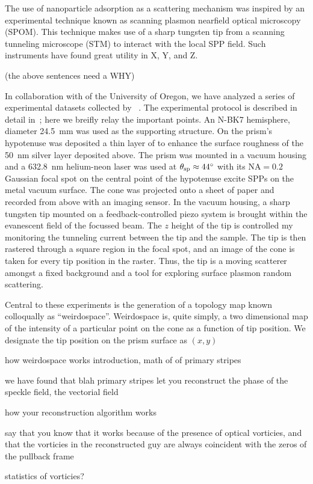 The use of nanoparticle adsorption as a scattering mechanism was inspired
by an experimental technique known as scanning plasmon nearfield optical
microscopy (SPOM).  This technique makes use of a sharp tungsten tip from a
scanning tunneling microscope (STM) to interact with the local SPP field.
Such instruments have found great utility in X, Y, and Z.

(the above sentences need a WHY)

In collaboration with  of the University of Oregon,
we have analyzed a series of experimental datasets collected by
~\cite{schumann2009surface}.  The experimental protocol is
described in detail in~\cite{schumann2009surface}; here we breifly relay
the important points.  An N-BK7 hemisphere, diameter
\SI{24.5}{\milli\meter} was used as the supporting structure.  On the
prism's hypotenuse was deposited a thin layer of  to enhance the
surface roughness of the \SI{50}{\nano\meter} silver layer deposited above.
The prism was mounted in a vacuum housing and a \SI{632.8}{\nano\meter}
helium-neon laser was used at $\theta_\mathrm{sp}\approx\SI{44}{\degree}$ with its
$\mathrm{NA}=0.2$ Gaussian focal spot on the central point of the
hypotenuse excite SPPs on the metal vacuum surface.  The cone was projected
onto a sheet of paper and recorded from above with an imaging sensor.  In
the vacuum housing, a sharp tungsten tip mounted on a feedback-controlled
piezo system is brought within the evanescent field of the focussed beam.
The $z$ height of the tip is controlled my monitoring the tunneling current
between the tip and the sample.  The tip is then rastered through a square
region in the focal spot, and an image of the cone is taken for every tip
position in the raster.  Thus, the tip is a moving scatterer amongst a
fixed background and a tool for exploring surface plasmon random
scattering.

Central to these experiments is the generation of a topology map known
colloqually as ``weirdospace''.  Weirdospace is, quite simply, a two
dimensional map of the intensity of a particular point on the cone as a
function of tip position.  We designate the tip position on the prism
surface as $(x,y)$

how weirdospace works
introduction, math of of primary stripes

we have found that blah primary stripes let you reconstruct the phase of
the speckle field, the vectorial field 

how your reconstruction algorithm works

say that you know that it works because of the presence of optical
vorticies, and that the vorticies in the reconstructed guy are always
coincident with the zeros of the pullback frame

statistics of vorticies?
